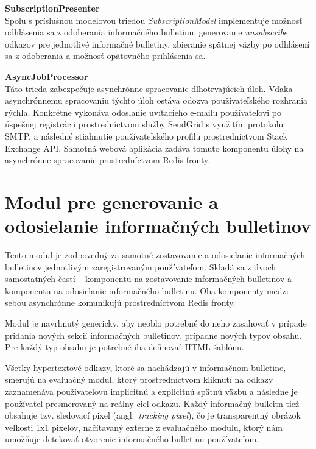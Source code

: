\textbf{SubscriptionPresenter}\\
Spolu s príslušnou modelovou triedou \textit{SubscriptionModel} implementuje možnosť odhlásenia sa z odoberania
informačného bulletinu, generovanie \textit{unsubscribe} odkazov pre jednotlivé informačné bulletiny, zbieranie spätnej
väzby po odhlásení sa z odoberania a možnosť opätovného prihlásenia sa.

\textbf{AsyncJobProcessor}\\
Táto trieda zabezpečuje asynchrónne spracovanie dlhotrvajúcich úloh. Vďaka asynchrónnemu spracovaniu týchto úloh ostáva
odozva používateľského rozhrania rýchla. Konkrétne vykonáva odoslanie uvítacieho e-mailu používateľovi po úspešnej
registrácii prostredníctvom služby SendGrid s využitím protokolu SMTP, a následné stiahnutie používateľského profilu
prostredníctvom Stack Exchange API.
Samotná webová aplikácia zadáva tomuto komponentu úlohy na asynchrónne spracovanie prostredníctvom Redis fronty.


\section{Modul pre generovanie a odosielanie informačných bulletinov}

Tento modul je zodpovedný za samotné zostavovanie a odosielanie informačných bulletinov jednotlivým zaregistrovaným
používateľom. Skladá sa z dvoch samostatných častí -- komponentu na zostavovanie informačných bulletinov a komponentu
na odosielanie informačného bulletinu. Oba komponenty medzi sebou asynchrónne komunikujú prostredníctvom Redis fronty.

Modul je navrhnutý genericky, aby neoblo potrebné do neho zasahovať v prípade pridania nových sekcií informačných bulletinov,
prípadne nových typov obsahu. Pre každý typ obsahu je potrebné iba definovať HTML šablónu.

Všetky hypertextové odkazy, ktoré sa nachádzajú v informačnom bulletine, smerujú na evaluačný modul, ktorý prostredníctvom
kliknutí na odkazy zaznamenáva používateľovu implicitnú a explicitnú spätnú väzbu a následne je používateľ presmerovaný
na reálny cieľ odkazu. Každý informačný bulleitn tiež obsahuje tzv. sledovací pixel (angl.~\textit{tracking pixel}), čo je
transparentný obrázok veľkosti 1x1 pixelov, načítavaný externe z evaluačného modulu, ktorý nám umožňuje detekovať otvorenie informačného
bulletinu používateľom.

